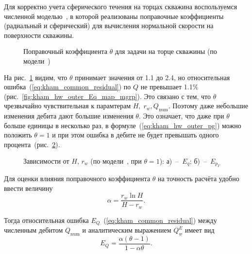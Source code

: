 \documentclass{article}
\begin{document}
Для корректно учета сферического течения на торцах скважина воспользуемся
численной моделью~\cite{lit:kham_mazo_uzku_2015}, в которой реализованы
поправочные коэффициенты (радиальный и сферический) для вычисления нормальной
скорости на поверхности скважины.

\begin{figure}[!ht]
\centering

\caption{Поправочный коэффициента $\theta$ для задачи на торце скважины (по модели~\cite{lit:kham_mazo_uzku_2015})}
\label{fig:kham_hw_outer_theta_map_mgrp}
\end{figure}

На рис.~\ref{fig:kham_hw_outer_theta_map_mgrp} видим, что $\theta$ принимает значения от 1.1 до 2.4, но относительная ошибка~(\ref{eq:kham_common_residual}) по $Q$ не превышает 1.1\% (рис.~\ref{fig:kham_hw_outer_Eq_map_mgrp}). Это связано с тем, что $\theta$ чрезвычайно чувствительная к парамтерам $H, \; r_w, Q_{\text{num}}$. Поэтому даже небольшие изменения дебита дают большие изменения $\theta$. Это означает, что даже при $\theta$ больше единицы в несколько раз, в формуле~(\ref{eq:kham_hw_outer_pg}) можно положить $\theta=1$ и при этом ошибка в дебите не будет превышать одного процента~(рис.~\ref{fig:kham_hw_outer_eq_map_mgrp}).

\begin{figure}[!ht]
\centering
\begin{subfigure}{0.48\textwidth}
\centering

\caption{}
\label{fig:kham_hw_outer_eq_map_mgrp}
\end{subfigure}
\hfill
\begin{subfigure}{0.48\textwidth}
\centering

\caption{}
\label{fig:kham_hw_outer_epg_map_mgrp}
\end{subfigure}
\caption{
Зависимости от $H$, $r_w$ (по модели~\cite{lit:kham_mazo_uzku_2015}, при $\theta = 1$):
а)~--~$E_q$;
б)~--~$E_{p_{\Gamma}}$
}
\label{fig:kham_hw_outer_theta_epg_maps_mgrp}
\end{figure}

Для оценки влияния поправочного коэффициента $\theta$ на точность расчёта удобно ввести величину
\[
\alpha = \frac{r_w \ln H}{H-r_w}.
\]

Тогда относительная ошибка $E_Q$~(\ref{eq:kham_common_residual}) между численным дебитом $Q_{\text{num}}$ и аналитическим выражением $Q_w^E$ имеет вид
\begin{equation}
E_Q = \dfrac{\alpha(\theta-1)}{1-\alpha\theta}.
\label{eq:kham_theta_error_exact}
\end{equation}
\end{document}
